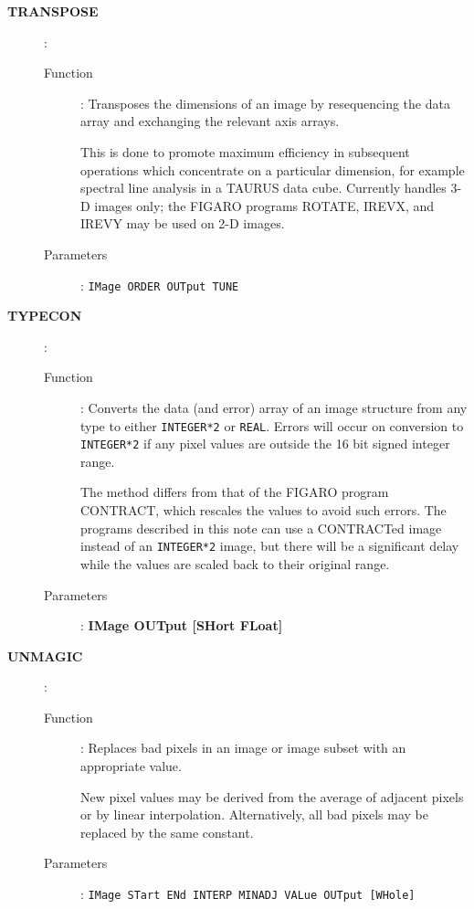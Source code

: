 \begin{description}
\item[\large\bf TRANSPOSE]:
   \begin{description}
   \item[Function]: 
      Transposes the dimensions of an image by resequencing the data
      array and exchanging the relevant axis arrays.

      This is done to promote maximum efficiency in subsequent
      operations which concentrate on a particular dimension, for
      example spectral line analysis in a TAURUS data cube. Currently
      handles 3-D images only; the FIGARO programs ROTATE, IREVX, and
      IREVY may be used on 2-D images.
   \item[Parameters]: 
      {\tt IMage ORDER OUTput TUNE}
   \end{description}

\item[\large\bf TYPECON]:
   \begin{description}
   \item[Function]: 
      Converts the data (and error) array of an image structure from
      any type to either {\tt INTEGER*2} or {\tt REAL}. Errors will
      occur on conversion to {\tt INTEGER*2} if any pixel values are
      outside the 16 bit signed integer range.

      The method differs from that of the FIGARO program CONTRACT,
      which rescales the values to avoid such errors. The programs
      described in this note can use a CONTRACTed image instead of an
      {\tt INTEGER*2} image, but there will be a significant delay
      while the values are scaled back to their original range.
   \item[Parameters]: 
      {\bf IMage OUTput [SHort FLoat]}
   \end{description}

\newpage

\item[\large\bf UNMAGIC]:
   \begin{description}
   \item[Function]: 
      Replaces bad pixels in an image or image subset with an
      appropriate value. 

      New pixel values may be derived from the average of adjacent
      pixels or by linear interpolation.  Alternatively, all bad pixels
      may be replaced by the same constant.
   \item[Parameters]: 
      {\tt IMage STart ENd INTERP MINADJ VALue OUTput [WHole]}
   \end{description}

\end{description}


